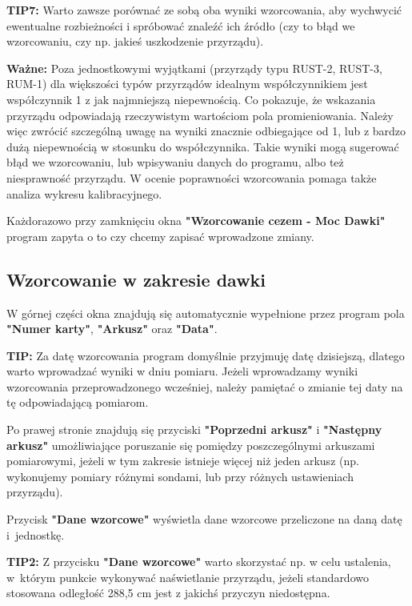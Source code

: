 \textbf{TIP7:} Warto zawsze porównać ze sobą oba wyniki wzorcowania, aby wychwycić ewentualne rozbieżności i spróbować znaleźć ich źródło (czy to błąd we wzorcowaniu, czy np. jakieś uszkodzenie przyrządu).

\textbf{Ważne:} Poza jednostkowymi wyjątkami (przyrządy typu RUST-2, RUST-3, RUM-1) dla większości typów przyrządów idealnym współczynnikiem jest współczynnik 1 z jak najmniejszą niepewnością. Co pokazuje, że wskazania przyrządu odpowiadają rzeczywistym wartościom pola promieniowania. Należy więc zwrócić szczególną uwagę na wyniki znacznie odbiegające od 1, lub z bardzo dużą niepewnością w stosunku do współczynnika. Takie wyniki mogą sugerować błąd we wzorcowaniu, lub wpisywaniu danych do programu, albo też niesprawność przyrządu. W ocenie poprawności wzorcowania pomaga także analiza wykresu kalibracyjnego.

Każdorazowo przy zamknięciu okna \textbf{"Wzorcowanie cezem - Moc Dawki"} program zapyta o to czy chcemy zapisać wprowadzone zmiany.

\subsection{Wzorcowanie w zakresie dawki}
\label{wzorcowanie_dawka}

W górnej części okna znajdują się automatycznie wypełnione przez program pola \textbf{"Numer karty"}, \textbf{"Arkusz"} oraz \textbf{"Data"}. 

\textbf{TIP:} Za datę wzorcowania program domyślnie przyjmuję datę dzisiejszą, dlatego warto wprowadzać wyniki w dniu pomiaru. Jeżeli wprowadzamy wyniki wzorcowania przeprowadzonego wcześniej, należy pamiętać o zmianie tej daty na tę odpowiadającą pomiarom.

Po prawej stronie znajdują się przyciski \textbf{"Poprzedni arkusz"} i \textbf{"Następny arkusz"} umożliwiające poruszanie się pomiędzy poszczególnymi arkuszami pomiarowymi, jeżeli w tym zakresie istnieje więcej niż jeden arkusz (np. wykonujemy pomiary różnymi sondami, lub przy różnych ustawieniach przyrządu).

Przycisk \textbf{"Dane wzorcowe"} wyświetla dane wzorcowe przeliczone na daną datę i~jednostkę.

\textbf{TIP2:} Z przycisku \textbf{"Dane wzorcowe"} warto skorzystać np. w celu ustalenia, w~którym punkcie wykonywać naświetlanie przyrządu, jeżeli standardowo stosowana odległość 288,5 cm jest z jakichś przyczyn niedostępna.


